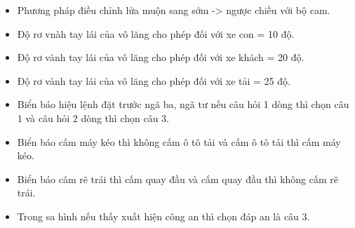 \documentclass{article}
\begin{document}
\begin{itemize}
\item     Phương pháp điều chỉnh lửa muộn sang sớm -> ngược chiều với bộ cam.
\item     Độ rơ vnàh tay lái của vô lăng cho phép đối với xe con = 10 độ.
\item     Độ rơ vành tay lái của vô lăng cho phép đối với xe khách = 20 độ.
\item     Độ rơ vành tay lái của vô lăng cho phép đối với xe tải = 25 độ.
\item     Biển báo hiệu lệnh đặt trước ngã ba, ngã tư nếu câu hỏi 1 dòng thì chọn câu 1 và câu hỏi 2 dòng thì chọn câu 3.
\item     Biển báo cấm máy kéo thì không cấm ô tô tải và cấm ô tô tải thì cấm máy kéo.
\item     Biển báo câm rẽ trái thì cấm quay đầu và cấm quay đầu thì không cấm rẽ trái.
\item     Trong sa hình nếu thấy xuất hiện công an thì chọn đáp an là câu 3.
\end{itemize}
\end{document}
